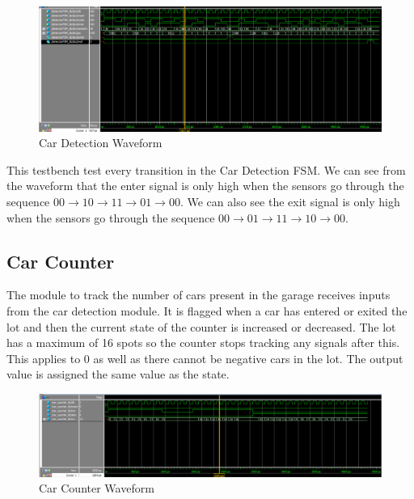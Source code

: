 \documentclass[11pt, titlepage]{article}
\begin{document}
            \begin{figure}[!htb]
                \centering
                \captionsetup{justification=centering}
                
                \includegraphics[scale = 0.45]{Images/detectorFSM testbench.png}
                
                \caption{Car Detection Waveform}
            \end{figure}
            This testbench test every transition in the Car Detection FSM. We can see from the waveform that the enter signal is only high when the sensors go through the sequence $00 \rightarrow 10 \rightarrow 11 \rightarrow 01 \rightarrow 00$. We can also see the exit signal is only high when the sensors go through the sequence $00 \rightarrow 01 \rightarrow 11 \rightarrow 10 \rightarrow 00$.
        
        \subsection{Car Counter}
            The module to track the number of cars present in the garage receives inputs from the car detection module. It is flagged when a car has entered or exited the lot and then the current state of the counter is increased or decreased. The lot has a maximum of 16 spots so the counter stops tracking any signals after this. This applies to 0 as well as there cannot be negative cars in the lot. The output value is assigned the same value as the state.

            \begin{figure}[!htb]
                \centering
                \captionsetup{justification=centering}
                
                \includegraphics[scale=0.43]{Images/car counter testbench.png}
                
                \caption{Car Counter Waveform}
            \end{figure} 
\end{document}
